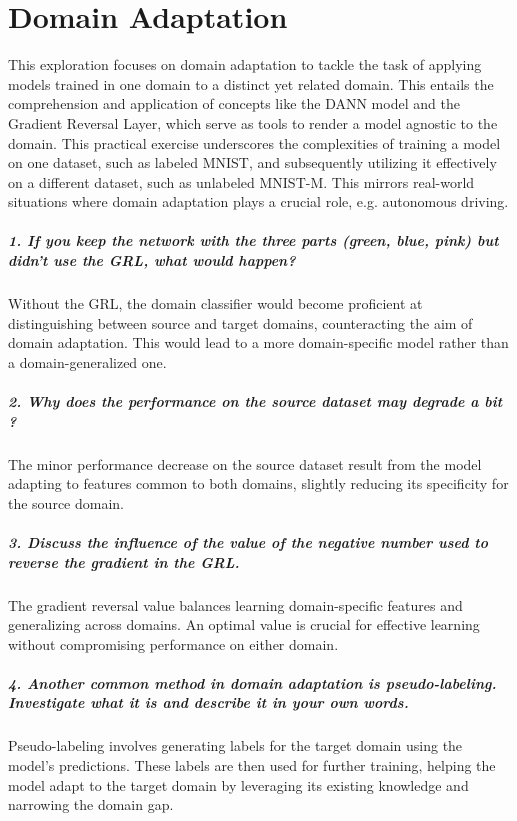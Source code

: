 \chapter{Domain Adaptation}
\graphicspath{{figs/2c/}}

This exploration focuses on domain adaptation to tackle the task of applying models trained in one domain to a distinct yet related domain. This entails the comprehension and application of concepts like the DANN model and the Gradient Reversal Layer, which serve as tools to render a model agnostic to the domain. This practical exercise underscores the complexities of training a model on one dataset, such as labeled MNIST, and subsequently utilizing it effectively on a different dataset, such as unlabeled MNIST-M. This mirrors real-world situations where domain adaptation plays a crucial role, e.g. autonomous driving.

\paragraph*{1. If you keep the network with the three parts (green, blue, pink) but didn't use the GRL, what would happen?}

Without the GRL, the domain classifier would become proficient at distinguishing between source and target domains, counteracting the aim of domain adaptation. This would lead to a more domain-specific model rather than a domain-generalized one.

\paragraph*{2. Why does the performance on the source dataset may degrade a bit ?}

The minor performance decrease on the source dataset result from the model adapting to features common to both domains, slightly reducing its specificity for the source domain.

\paragraph*{3. Discuss the influence of the value of the negative number used to reverse the gradient in the GRL.}

The gradient reversal value balances learning domain-specific features and generalizing across domains. An optimal value is crucial for effective learning without compromising performance on either domain.

\paragraph*{4. Another common method in domain adaptation is pseudo-labeling. Investigate what it is and describe it in your own words.}

Pseudo-labeling involves generating labels for the target domain using the model's predictions. These labels are then used for further training, helping the model adapt to the target domain by leveraging its existing knowledge and narrowing the domain gap.